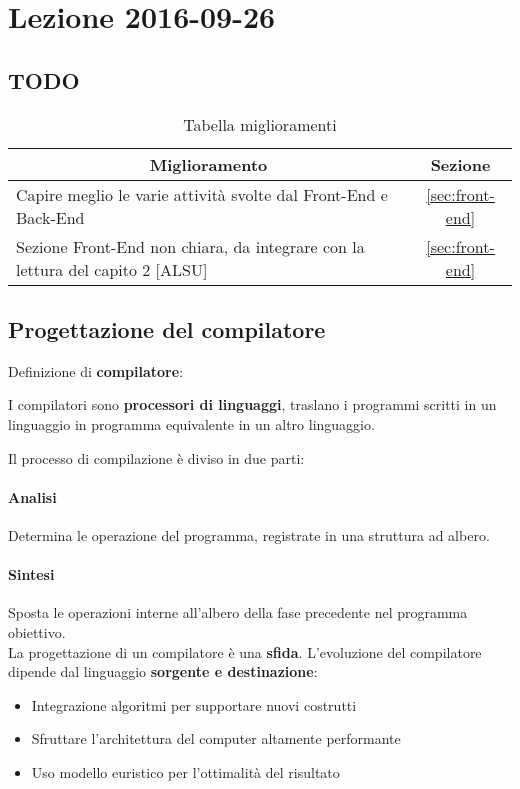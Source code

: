 \section{Lezione 2016-09-26}
\subsection{TODO}
\begin{table}[ht]
\begin{center}
\begin{tabular}{|l|c|}
\hline
\multicolumn{1}{|c|}{\textbf{Miglioramento}} & \textbf{Sezione} \\ \hline
Capire meglio le varie attività svolte dal Front-End e Back-End &
\ref{sec:front-end} \\ \hline
Sezione Front-End non chiara, da integrare con la lettura del capito 2 [ALSU] &
\ref{sec:front-end} \\ \hline
\end{tabular}
\end{center}
\caption{Tabella miglioramenti}
\label{tab:tab_todo_2}
\end{table}

\subsection{Progettazione del compilatore}
\label{sec:progettazione_compilatore}
Definizione di \textbf{compilatore}:

\begin{definition}
I compilatori sono \textbf{processori di linguaggi}, traslano i programmi
scritti in un linguaggio in programma equivalente in un altro linguaggio.
\end{definition}

Il processo di compilazione è diviso in due parti:
\paragraph{Analisi}
Determina le operazione del programma, registrate in una struttura ad albero.
\paragraph{Sintesi}
Sposta le operazioni interne all'albero della fase precedente nel programma
obiettivo. \\

La progettazione di un compilatore è una \textbf{sfida}. L'evoluzione del
compilatore dipende dal linguaggio \textbf{sorgente e destinazione}:
\begin{itemize}
\item Integrazione algoritmi per supportare nuovi costrutti
\item Sfruttare l'architettura del computer altamente performante
\item Uso modello euristico per l'ottimalità del risultato
\end{itemize}

